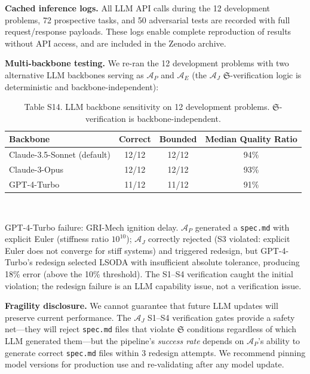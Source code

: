 \documentclass[11pt,a4paper]{article}
\newcommand{\Sclass}{\mathfrak{S}}
\newcommand{\Agent}{\mathcal{A}}
\begin{document}
\textbf{Cached inference logs.} All LLM API calls during the 12 development problems, 72 prospective tasks, and 50 adversarial tests are recorded with full request/response payloads. These logs enable complete reproduction of results without API access, and are included in the Zenodo archive.

\textbf{Multi-backbone testing.} We re-ran the 12 development problems with two alternative LLM backbones serving as $\Agent_P$ and $\Agent_E$ (the $\Agent_J$ $\Sclass$-verification logic is deterministic and backbone-independent):

\begin{table}[htbp]
\centering
\caption{Table S14. LLM backbone sensitivity on 12 development problems. $\Sclass$-verification is backbone-independent.}
\small
\begin{tabularx}{\textwidth}{Xccc}
\toprule
\textbf{Backbone} & \textbf{Correct} & \textbf{Bounded} & \textbf{Median Quality Ratio} \\
\midrule
Claude-3.5-Sonnet (default) & 12/12 & 12/12 & 94\% \\
Claude-3-Opus & 12/12 & 12/12 & 93\% \\
GPT-4-Turbo & 11/12 & 11/12 & 91\% \\
\bottomrule
\end{tabularx}\\[3pt]
\raggedright\scriptsize GPT-4-Turbo failure: GRI-Mech ignition delay. $\Agent_P$ generated a \texttt{spec.md} with explicit Euler (stiffness ratio $10^{10}$); $\Agent_J$ correctly rejected (S3 violated: explicit Euler does not converge for stiff systems) and triggered redesign, but GPT-4-Turbo's redesign selected LSODA with insufficient absolute tolerance, producing 18\% error (above the 10\% threshold). The S1--S4 verification caught the initial violation; the redesign failure is an LLM capability issue, not a verification issue.
\end{table}

\textbf{Fragility disclosure.} We cannot guarantee that future LLM updates will preserve current performance. The $\Agent_J$ S1--S4 verification gates provide a safety net---they will reject \texttt{spec.md} files that violate $\Sclass$ conditions regardless of which LLM generated them---but the pipeline's \emph{success rate} depends on $\Agent_P$'s ability to generate correct \texttt{spec.md} files within 3 redesign attempts. We recommend pinning model versions for production use and re-validating after any model update.

\end{document}
